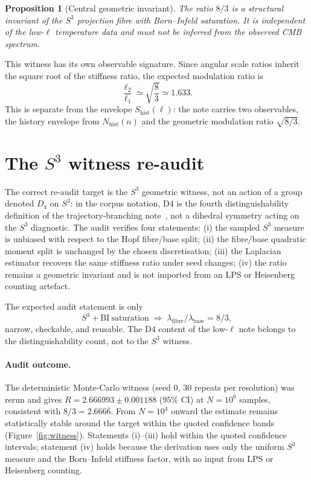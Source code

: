 \documentclass[11pt]{article}
\newtheorem{proposition}{Proposition}
\newcommand{\Nhist}{N_{\mathrm{hist}}}
\newcommand{\Shist}{S_{\mathrm{hist}}}
\begin{document}
\begin{proposition}[Central geometric invariant]
\label{prop:invariant}
The ratio $8/3$ is a structural invariant of the $S^3$ projection fibre with Born--Infeld
saturation.
It is independent of the low-$\ell$ temperature data and must not be inferred from the observed CMB
spectrum.
\end{proposition}

This witness has its own observable signature.
Since angular scale ratios inherit the square root of the stiffness ratio, the expected modulation
ratio is
\[
\frac{\ell_2}{\ell_1}\simeq\sqrt{\frac{8}{3}}\simeq 1.633 .
\]
This is separate from the envelope $\Shist(\ell)$: the note carries two observables, the history
envelope from $\Nhist(n)$ and the geometric modulation ratio $\sqrt{8/3}$.

\section{The $S^3$ witness re-audit}
\label{sec:reaudit}

The correct re-audit target is the $S^3$ geometric witness, not an action of a group denoted $D_4$
on $S^3$: in the corpus notation, D4 is the fourth distinguishability definition of the
trajectory-branching note~\cite{Beau2026tb}, not a dihedral symmetry acting on the $S^3$
diagnostic.
The audit verifies four statements: (i) the sampled $S^3$ measure is unbiased with respect to the
Hopf fibre/base split; (ii) the fibre/base quadratic moment split is unchanged by the chosen
discretisation; (iii) the Laplacian estimator recovers the same stiffness ratio under seed changes;
(iv) the ratio remains a geometric invariant and is not imported from an LPS or Heisenberg counting
artefact.

The expected audit statement is only
\[
S^3+\mathrm{BI\ saturation}\;\Longrightarrow\;\lambda_{\mathrm{fibre}}/\lambda_{\mathrm{base}}=8/3,
\]
narrow, checkable, and reusable.
The D4 content of the low-$\ell$ note belongs to the distinguishability count, not to the $S^3$
witness.

\paragraph{Audit outcome.}
The deterministic Monte-Carlo witness (seed $0$, $30$ repeats per resolution) was rerun and gives
$R=2.666993\pm0.001188$ ($95\%$ CI) at $N=10^6$ samples, consistent with $8/3=2.666\overline{6}$.
From $N=10^4$ onward the estimate remains statistically stable around the target within the quoted
confidence bands (Figure~\ref{fig:witness}).
Statements (i)--(iii) hold within the quoted confidence intervals; statement (iv) holds because the
derivation uses only the uniform $S^3$ measure and the Born--Infeld stiffness factor, with no input
from LPS or Heisenberg counting.
\end{document}
